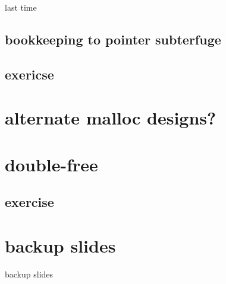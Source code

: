 \date{}
\title{}
\date{}

\begin{frame}
    \titlepage
\end{frame}

\begin{frame}{last time}
\end{frame}

\subsection{bookkeeping to pointer subterfuge}


\subsection{exericse}


\section{alternate malloc designs?}


\section{double-free}


\subsection{exercise}






\section{backup slides}
\begin{frame}{backup slides}
\end{frame}


